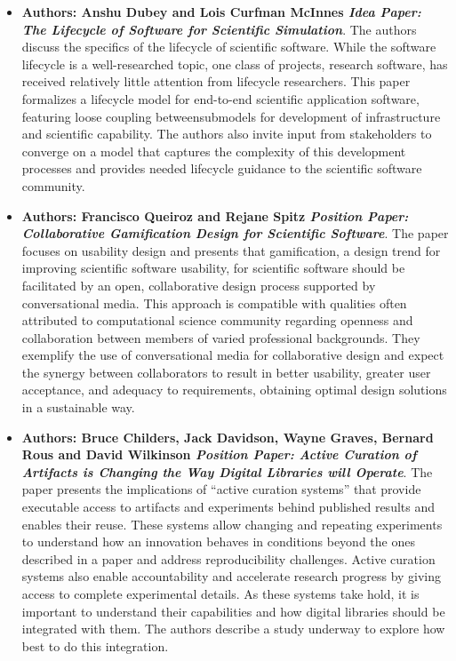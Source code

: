 \documentclass[11pt, oneside]{amsart}
\begin{document}
\begin{itemize}
\item \textbf{Authors: Anshu Dubey and Lois Curfman McInnes \emph{Idea Paper: The Lifecycle of Software for Scientific Simulation}}.
The authors discuss the specifics of the lifecycle of scientific software. While the software lifecycle is a well-researched topic, one class of projects, research software, has received relatively
little attention from lifecycle researchers. This
paper formalizes a lifecycle model
for end-to-end scientific application software, featuring loose
coupling betweensubmodels for development of infrastructure
and scientific capability. The authors also invite input from stakeholders
to converge on a model that captures the complexity of this
development processes and provides needed lifecycle guidance to
the scientific software community.

\item \textbf{Authors: Francisco Queiroz and Rejane Spitz \emph{Position Paper: Collaborative Gamification Design for Scientific Software}}. 
The paper focuses on usability design and presents that gamification, a design trend for improving scientific software usability, for scientific software should be facilitated by an open, collaborative design process supported by 
conversational media. This approach is compatible with 
qualities often attributed to computational science community 
regarding openness and collaboration between members of varied 
professional backgrounds. They exemplify the use of conversational media for collaborative design and expect the synergy between collaborators to result in better usability,  greater user acceptance, and adequacy to requirements, 
obtaining optimal design solutions in a sustainable way.   

\item \textbf{Authors: Bruce Childers, Jack Davidson, Wayne Graves, Bernard Rous and David Wilkinson \emph{Position Paper: Active Curation of Artifacts is Changing the Way Digital Libraries will Operate}}.
The paper presents the implications of “active curation systems” that provide executable access to
artifacts and experiments behind published results and enables
their reuse. These systems allow changing and repeating experiments to understand how an innovation behaves in conditions
beyond the ones described in a paper and address reproducibility challenges. Active curation systems
also  enable accountability and accelerate research progress  by
giving access to complete experimental details. As these systems
take  hold,  it  is  important  to  understand  their  capabilities  and
how digital libraries should be integrated with them. The authors describe a study underway to explore how best
to do this integration. 


\end{itemize}
\end{document}
